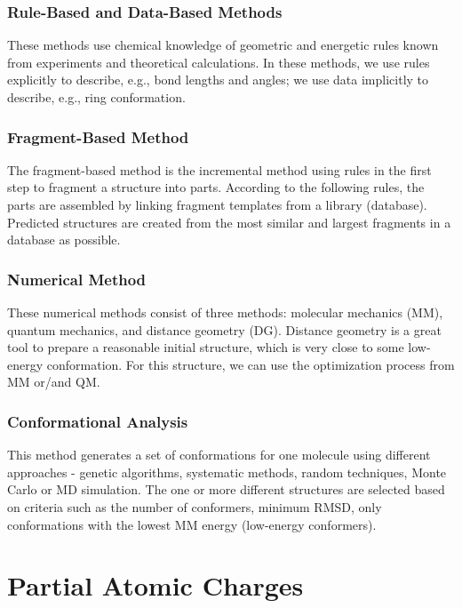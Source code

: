 \subsection{Rule-Based and Data-Based Methods}

These methods use chemical knowledge of geometric and energetic rules known
from experiments and theoretical calculations. In these methods, we use rules
explicitly to describe, e.g., bond lengths and angles; we use data implicitly
to describe, e.g., ring conformation.

\subsection{Fragment-Based Method}

The fragment-based method is the incremental method using rules in the first
step to fragment a structure into parts. According to the following rules,
the parts are assembled by linking fragment templates from a library
(database). Predicted structures are created from the most similar and largest
fragments in a database as possible.

\subsection{Numerical Method}

These numerical methods consist of three methods: molecular mechanics
(MM), quantum mechanics, and distance geometry (DG). Distance geometry is
a great tool to prepare a reasonable initial structure, which is very close
to some low-energy conformation. For this structure, we can use
the optimization process from MM or/and QM.

\subsection{Conformational Analysis}

This method generates a set of conformations for one molecule using
different approaches - genetic algorithms, systematic methods, random
techniques, Monte Carlo or MD simulation. The one or more different structures
are selected based on criteria such as the number of conformers, minimum
RMSD, only conformations with the lowest MM energy (low-energy conformers).

\chapter{Partial Atomic Charges}

